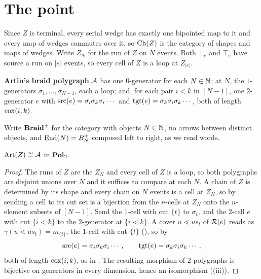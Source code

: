 \documentclass[11pt]{article}
\begin{document}
\section{The point}\label{sec:thmC}

Since $Z$ is terminal, every serial wedge has exactly one bipointed map to it and every map of
wedges commutes over it, so $\operatorname{Ch}(Z)$ is the category of shapes and maps of wedges. Write $Z_N$ for
the run of $Z$ on $N$ events. Both $\bot_e$ and $\top_e$ have source a run on $|e|$ events, so
every cell of $Z$ is a loop at $Z_{|e|}$.

\begin{definition}\label{def:artin-poly}
  \textbf{Artin's braid polygraph} $\mathcal{A}$ has one $0$-generator for each $N \in \mathbb{N}$; at $N$,
  the $1$-generators $\sigma_1,\dots,\sigma_{N-1}$, each a loop; and, for each pair $i<k$ in
  $[N-1]$, one $2$-generator $e$ with $\operatorname{src}(e) = \sigma_i\sigma_k\sigma_i\cdots$ and
  $\operatorname{tgt}(e) = \sigma_k\sigma_i\sigma_k\cdots$, both of length $\operatorname{cox}(i,k)$.
\end{definition}


Write $\mathbf{Braid}^{+}$ for the category with objects $N \in \mathbb{N}$, no arrows between distinct objects, and
$\operatorname{End}(N) = B_N^+$ composed left to right, as we read words.

\begin{theorem}\label{thm:C}
  $\operatorname{Art}(Z) \cong \mathcal{A}$ in $\mathbf{Pol}_2$.
\end{theorem}
\begin{proof}
  The runs of $Z$ are the $Z_N$ and every cell of $Z$ is a loop, so both polygraphs are disjoint
  unions over $N$ and it suffices to compare at each $N$. A chain of $Z$ is determined by its
  shape and every chain on $N$ events is a cell at $Z_N$, so by  sending a cell to
  its cut set is a bijection from the $n$-cells at $Z_N$ onto the $n$-element subsets of $[N-1]$.
  Send the $1$-cell with cut $\{t\}$ to $\sigma_t$, and the $2$-cell $e$ with cut $\{i<k\}$ to the
  $2$-generator at $\{i<k\}$. A cover $u \lessdot us_t$ of $\mathcal{R}(e)$ reads as
  $\gamma(u \lessdot us_t) = m_{\{t\}}$, the $1$-cell with cut $\{t\}$
  (), so by 
  \[
    \operatorname{src}(e) = \sigma_i\sigma_k\sigma_i\cdots, \qquad \operatorname{tgt}(e) = \sigma_k\sigma_i\sigma_k\cdots,
  \]
  both of length $\operatorname{cox}(i,k)$, as in . The resulting morphism of
  $2$-polygraphs is bijective on generators in every dimension, hence an isomorphism
  ((iii)).
\end{proof}
\end{document}

